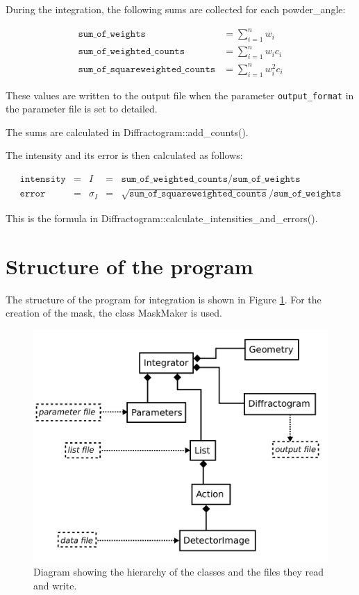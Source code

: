 \documentclass[a4paper, 12pt, twoside]{scrartcl}
\begin{document}
During the integration, the following sums are collected for each powder\_angle:

\begin{align*}
	\texttt{sum\_of\_weights} &= \sum\limits_{i=1}^{n} w_i \\
	\texttt{sum\_of\_weighted\_counts} &= \sum\limits_{i=1}^{n} w_i c_i \\
	\texttt{sum\_of\_squareweighted\_counts} &= \sum\limits_{i=1}^{n} w_i^2 c_i
\end{align*}

These values are written to the output file when the parameter \texttt{output\_format} in the parameter file is set to detailed.

The sums are calculated in Diffractogram::add\_counts().

The intensity and its error is then calculated as follows:

\begin{align*}
	\texttt{intensity} &=& I &=& \texttt{sum\_of\_weighted\_counts}\big/\texttt{sum\_of\_weights} \\
	\texttt{error} &=& \sigma_I &=& \sqrt{\texttt{sum\_of\_squareweighted\_counts}}\big/\texttt{sum\_of\_weights}
\end{align*}

This is the formula in Diffractogram::calculate\_intensities\_and\_errors().

\section{Structure of the program}

The structure of the program for integration is shown in Figure \ref{fig:class_diagram}. For the creation of the mask, the class MaskMaker is used.

\begin{figure}
	\includegraphics[width=15cm]{figs/class_diagram.pdf}
	\caption{\label{fig:class_diagram}Diagram showing the hierarchy of the classes and the files they read and write.}
\end{figure}
\end{document}
